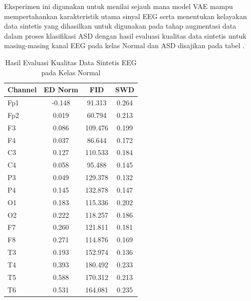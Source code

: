 Eksperimen ini digunakan untuk menilai sejauh mana model VAE mampu mempertahankan karakteristik utama sinyal EEG serta menentukan kelayakan data sintetis yang dihasilkan untuk digunakan pada tahap augmentasi data dalam proses klasifikasi ASD dengan hasil evaluasi kualitas data sintetis untuk masing-masing kanal EEG pada kelas Normal dan ASD disajikan pada tabel .
\begin{table}[H]
\centering
\caption{Hasil Evaluasi Kualitas Data Sintetis EEG pada Kelas Normal}
\label{tab:normal_generation_results}
\renewcommand{\arraystretch}{1.15}
\begin{tabular}{|l|c|c|c|}
\hline
\textbf{Channel} & \textbf{ED Norm} & \textbf{FID} & \textbf{SWD} \\
\hline
Fp1 & -0.148 & 91.313  & 0.264 \\
Fp2 & 0.019  & 60.794  & 0.213 \\
F3  & 0.086  & 109.476 & 0.199 \\
F4  & 0.037  & 86.644  & 0.172 \\
C3  & 0.127  & 110.533 & 0.184 \\
C4  & 0.058  & 95.488  & 0.145 \\
P3  & 0.049  & 129.378 & 0.132 \\
P4  & 0.145  & 132.878 & 0.147 \\
O1  & 0.183  & 115.336 & 0.202 \\
O2  & 0.222  & 118.257 & 0.186 \\
F7  & 0.260  & 121.811 & 0.181 \\
F8  & 0.271  & 114.876 & 0.169 \\
T3  & 0.193  & 152.974 & 0.136 \\
T4  & 0.393  & 180.492 & 0.233 \\
T5  & 0.588  & 170.312 & 0.213 \\
T6  & 0.531  & 164.081 & 0.235 \\
\hline
\end{tabular}
\end{table}
